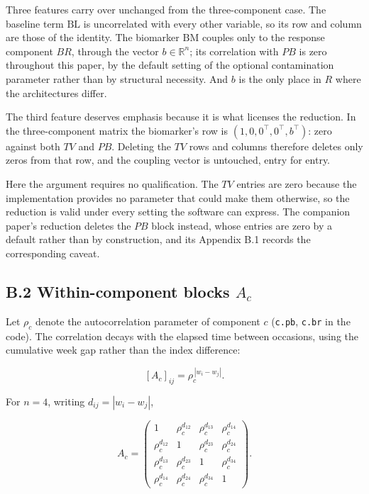 \documentclass[
  11pt,
]{article}
\begin{document}
Three features carry over unchanged from the three-component case.
The baseline term \(\mathrm{BL}\) is uncorrelated with every other
variable, so its row and column are those of the identity. The
biomarker \(\mathrm{BM}\) couples only to the response component \(BR\),
through the vector \(b \in \mathbb{R}^{n}\); its correlation with \(PB\)
is zero throughout this paper, by the default setting of the optional
contamination parameter rather than by structural necessity. And \(b\) is the only place in \(R\) where
the architectures differ.

The third feature deserves emphasis because it is what licenses the
reduction. In the three-component matrix the biomarker's row is
\((1, 0, 0^{\top}, 0^{\top}, b^{\top})\): zero against both \(TV\) and
\(PB\). Deleting the \(TV\) rows and columns therefore deletes only zeros
from that row, and the coupling vector is untouched, entry for entry.

Here the argument requires no qualification. The \(TV\) entries are
zero because the implementation provides no parameter that could make
them otherwise, so the reduction is valid under every setting the
software can express. The companion paper's reduction deletes the
\(PB\) block instead, whose entries are zero by a default rather than
by construction, and its Appendix B.1 records the corresponding
caveat.

\subsection{B.2 Within-component blocks $A_c$}

Let \(\rho_c\) denote the autocorrelation parameter of component \(c\)
(\texttt{c.pb}, \texttt{c.br} in the code). The correlation decays
with the elapsed time between occasions, using the cumulative week
gap rather than the index difference:

\[
[A_c]_{ij} = \rho_c^{\,|w_i - w_j|}.
\]

For \(n = 4\), writing \(d_{ij} = |w_i - w_j|\),

\[
A_c =
\begin{pmatrix}
1 & \rho_c^{d_{12}} & \rho_c^{d_{13}} & \rho_c^{d_{14}}\\
\rho_c^{d_{12}} & 1 & \rho_c^{d_{23}} & \rho_c^{d_{24}}\\
\rho_c^{d_{13}} & \rho_c^{d_{23}} & 1 & \rho_c^{d_{34}}\\
\rho_c^{d_{14}} & \rho_c^{d_{24}} & \rho_c^{d_{34}} & 1
\end{pmatrix}.
\]
\end{document}
